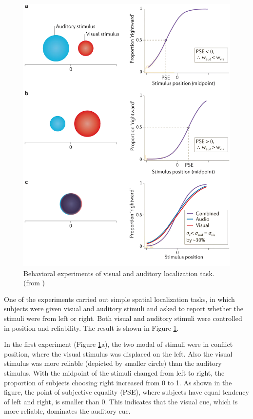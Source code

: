 \documentclass{article}[11pt]
\begin{document}
\begin{figure}[tpbh]
  \centering
  \includegraphics[width=.9\textwidth]{fetsch-visaudloc}
  \caption{Behavioral experiments of visual and auditory localization task. (from \cite{fetsch_bridging_2013})}
  \label{fig:visaudloc}
\end{figure}

One of the experiments \cite{alais_ventriloquist_2004} carried out simple spatial localization tasks, in which subjects were given visual and auditory stimuli and asked to report whether the stimuli were from left or right. Both visual and auditory stimuli were controlled in position and reliability. The result is shown in Figure \ref{fig:visaudloc}.

In the first experiment (Figure \ref{fig:visaudloc}a), the two modal of stimuli were in conflict position, where the visual stimulus was displaced on the left. Also the visual stimulus was more reliable (depicted by smaller circle) than the auditory stimulus. With the midpoint of the stimuli changed from left to right, the proportion of subjects choosing right increased from 0 to 1. As shown in the figure, the point of subjective equality (PSE), where subjects have equal tendency of left and right, is smaller than 0. This indicates that the visual cue, which is more reliable, dominates the auditory cue.
\end{document}
